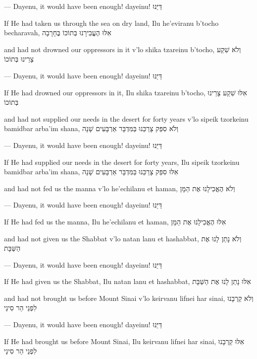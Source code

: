 {\begin{itemize}
{		— Dayenu, it would have been enough!		
		dayeinu!
		\texthebrew{דַּיֵּנוּ}

		If He had taken us through the sea on dry land,		
		Ilu he'eviranu b'tocho becharavah,
		\texthebrew{אִלּוּ הֶעֱבִירָנוּ בְּתוֹכוֹ בֶּחָרָבָה}

		and had not drowned our oppressors in it		
		v'lo shika tzareinu b'tocho,
		\texthebrew{וְלֹא שִׁקַע צָרֵינוּ בְּתוֹכוֹ}

		— Dayenu, it would have been enough!
		dayeinu!
		\texthebrew{דַּיֵּנוּ}

		If He had drowned our oppressors in it,
		Ilu shika tzareinu b'tocho,
		\texthebrew{אִלּוּ שִׁקַע צָרֵינוּ בְּתוֹכוֹ}

		and had not supplied our needs in the desert for forty years
		v'lo sipeik tzorkeinu bamidbar arba'im shana,
		\texthebrew{וְלֹא סִפֵּק צָרַכֵּנוּ בַּמִּדְבָּר אַרְבָּעִים שָׁנָה}

		— Dayenu, it would have been enough!
		dayeinu!
		\texthebrew{דַּיֵּנוּ}

		If He had supplied our needs in the desert for forty years,
		Ilu sipeik tzorkeinu bamidbar arba'im shana,
		\texthebrew{אִלּוּ סִפֵּק צָרַכֵּנוּ בַּמִּדְבָּר אַרְבָּעִים שָׁנָה}
		
		and had not fed us the manna
		v'lo he'echilanu et haman,
		\texthebrew{וְלֹא הֶאֱכִילָנוּ אֶת הַמָּן}

		— Dayenu, it would have been enough!
		dayeinu!
		\texthebrew{דַּיֵּנוּ}

		If He had fed us the manna,		
		Ilu he'echilanu et haman,
		\texthebrew{אִלּוּ הֶאֱכִילָנוּ אֶת הַמָּן}
		
		and had not given us the Shabbat
		v'lo natan lanu et hashabbat,
		\texthebrew{וְלֹא נָתַן לָנוּ אֶת הַשַּׁבָּת}		
		
		— Dayenu, it would have been enough!
		dayeinu!
		\texthebrew{דַּיֵּנוּ}	
		
		If He had given us the Shabbat,
		Ilu natan lanu et hashabbat,
		\texthebrew{אִלּוּ נָתַן לָנוּ אֶת הַשַּׁבָּת}
		
		and had not brought us before Mount Sinai
		v'lo keirvanu lifnei har sinai,
		\texthebrew{וְלֹא קֵרְבָנוּ לִפְנֵי הַר סִינַי}
		
		— Dayenu, it would have been enough!
		dayeinu!
		\texthebrew{דַּיֵּנוּ}

		If He had brought us before Mount Sinai,
		Ilu keirvanu lifnei har sinai,
		\texthebrew{אִלּוּ קֵרְבָנוּ לִפְנֵי הַר סִינַי}
		
}
\end{itemize}}
